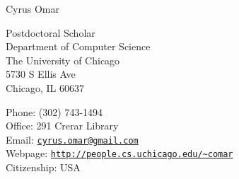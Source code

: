 \documentclass[10pt,letterpaper]{article}
\def\name{Cyrus Omar}
\renewenvironment{itemize}{
  \begin{list}{}{
    \setlength{\leftmargin}{1.25em}
    \setlength{\itemsep}{0.25em}
    \setlength{\parskip}{0pt}
    \setlength{\parsep}{0.2em}
  }
}{
  \end{list}
}
\begin{document}
{\LARGE \name}


\bigskip

\begin{minipage}[t]{0.495\textwidth}
  Postdoctoral Scholar\\
  Department of Computer Science\\
  The University of Chicago\\
5730 S Ellis Ave\\
Chicago, IL 60637\\
\end{minipage}
\begin{minipage}[t]{0.495\textwidth}
  Phone: (302) 743-1494 \\
  Office: 291 Crerar Library \\
  Email: \href{mailto:comar@cs.cmu.edu}{\texttt{cyrus.omar@gmail.com}} \\
  Webpage: \href{http://people.cs.uchicago.edu/~comar}{\texttt{http://people.cs.uchicago.edu/\textasciitilde comar}} \\
  Citizenship: USA
\end{minipage}


\end{document}
